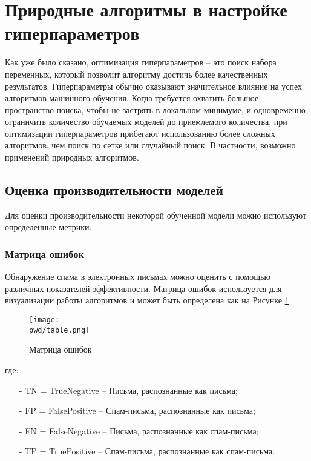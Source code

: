 \section{Природные алгоритмы в настройке гиперпараметров}\label{Section:Performance}

Как уже было сказано, оптимизация гиперпараметров -- это поиск набора переменных, который позволит
алгоритму достичь более качественных результатов. Гиперпараметры обычно оказывают 
значительное влияние на успех алгоритмов машинного обучения. 
Когда требуется охватить большое пространство поиска, чтобы не застрять 
в локальном минимуме, и одновременно ограничить количество обучаемых 
моделей до приемлемого количества, при оптимизации гиперпараметров прибегают 
использованию более сложных алгоритмов, чем поиск по сетке или случайный поиск. 
В частности, возможно применений природных алгоритмов.

\subsection{Оценка производительности моделей}\label{Scorer}

Для оценки производительности некоторой обученной модели можно используют определенные метрики.

    \subsubsection{Матрица ошибок}

        Обнаружение спама в электронных письмах можно оценить с помощью
        различных показателей эффективности. Матрица ошибок используется для 
        визуализации работы алгоритмов и может быть определена как на Рисунке \ref{CM}.

        \begin{figure}[H]	
            \centering
            \texttt{[image: \\pwd/table.png]}
            \caption{Матрица ошибок}
            \label{CM}
        \end{figure}
        где:

        \begin{itemize}
            \item[-] TN = TrueNegative -- Письма, распознанные как письма;
            \item[-] FP = FalsePositive -- Спам-письма, распознанные как письма;
            \item[-] FN = FalseNegative -- Письма, распознанные как спам-письма;
            \item[-] TP = TruePositive -- Спам-письма, распознанные как спам-письма.
        \end{itemize}


